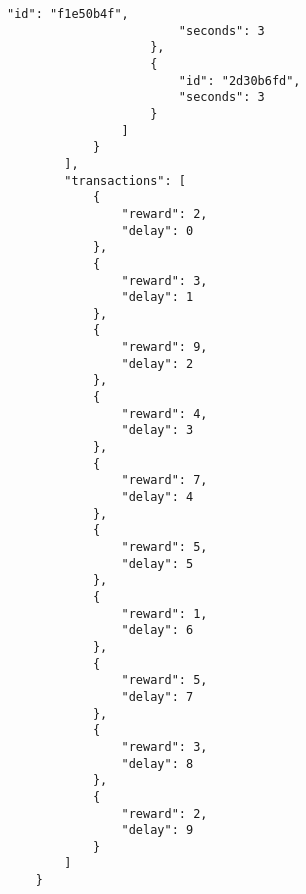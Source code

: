 \begin{lstlisting}[caption={Scenario 2}, label={lst:scenario 2}]
                        "id": "f1e50b4f",
                        "seconds": 3
                    },
                    {
                        "id": "2d30b6fd",
                        "seconds": 3
                    }
                ]
            }
        ],
        "transactions": [
            {
                "reward": 2,
                "delay": 0
            },
            {
                "reward": 3,
                "delay": 1
            },
            {
                "reward": 9,
                "delay": 2
            },
            {
                "reward": 4,
                "delay": 3
            },
            {
                "reward": 7,
                "delay": 4
            },
            {
                "reward": 5,
                "delay": 5
            },
            {
                "reward": 1,
                "delay": 6
            },
            {
                "reward": 5,
                "delay": 7
            },
            {
                "reward": 3,
                "delay": 8
            },
            {
                "reward": 2,
                "delay": 9
            }
        ]
    }
\end{lstlisting}